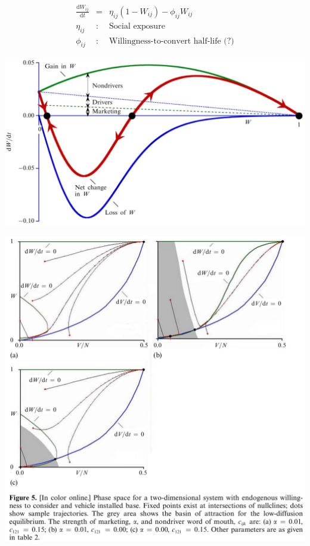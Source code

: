 \documentclass{beamer}
\begin{document}
    
\begin{frame}
  \begin{eqnarray*}
    \frac{\mathrm{d}W_{ij}}{\mathrm{d}t}&=&\eta_{ij}(1-W_{ij})-\phi_{ij}W_{ij}\\
    \eta_{ij}&:& \textrm{Social exposure}\\
    \phi_{ij}&:& \textrm{Willingness-to-convert half-life (?)}
  \end{eqnarray*}

  \includegraphics[width=\textwidth]{Sterman-fig-4.jpg}
\end{frame}
    
\begin{frame}
  \includegraphics[height=\textheight]{Sterman-fig-5.jpg}
\end{frame}
    
\end{document}
